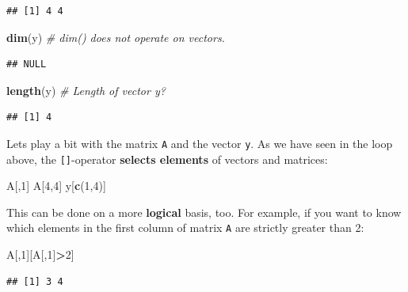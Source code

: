 \documentclass[]{book}
\newenvironment{Shaded}{\begin{snugshade}}{\end{snugshade}}
\newcommand{\CommentTok}[1]{\textcolor[rgb]{0.56,0.35,0.01}{\textit{#1}}}
\newcommand{\DecValTok}[1]{\textcolor[rgb]{0.00,0.00,0.81}{#1}}
\newcommand{\KeywordTok}[1]{\textcolor[rgb]{0.13,0.29,0.53}{\textbf{#1}}}
\newcommand{\NormalTok}[1]{#1}
\newcommand{\OperatorTok}[1]{\textcolor[rgb]{0.81,0.36,0.00}{\textbf{#1}}}
\theoremstyle{definition}
\theoremstyle{definition}
\theoremstyle{definition}
\theoremstyle{remark}
\begin{document}
\begin{verbatim}
## [1] 4 4
\end{verbatim}

\begin{Shaded}
\begin{Highlighting}[]
\KeywordTok{dim}\NormalTok{(y)    }\CommentTok{# dim() does not operate on vectors.}
\end{Highlighting}
\end{Shaded}

\begin{verbatim}
## NULL
\end{verbatim}

\begin{Shaded}
\begin{Highlighting}[]
\KeywordTok{length}\NormalTok{(y) }\CommentTok{# Length of vector y?}
\end{Highlighting}
\end{Shaded}

\begin{verbatim}
## [1] 4
\end{verbatim}

Lets play a bit with the matrix \texttt{A} and the vector \texttt{y}. As we have seen in the loop above, the \texttt{{[}{]}}-operator \textbf{selects elements} of vectors and matrices:

\begin{Shaded}
\begin{Highlighting}[]
\NormalTok{A[,}\DecValTok{1}\NormalTok{]}
\NormalTok{A[}\DecValTok{4}\NormalTok{,}\DecValTok{4}\NormalTok{]}
\NormalTok{y[}\KeywordTok{c}\NormalTok{(}\DecValTok{1}\NormalTok{,}\DecValTok{4}\NormalTok{)]}
\end{Highlighting}
\end{Shaded}

This can be done on a more \textbf{logical} basis, too. For example, if you want to know which elements in the first column of matrix \texttt{A} are strictly greater than 2:

\begin{Shaded}
\begin{Highlighting}[]
\NormalTok{A[,}\DecValTok{1}\NormalTok{][A[,}\DecValTok{1}\NormalTok{]}\OperatorTok{>}\DecValTok{2}\NormalTok{]}
\end{Highlighting}
\end{Shaded}

\begin{verbatim}
## [1] 3 4
\end{verbatim}
\end{document}
